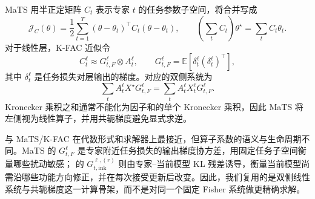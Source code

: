 MaTS 用半正定矩阵 $C_t$ 表示专家 $t$ 的任务参数子空间，将合并写成
\begin{equation}
  \mathcal J_C(\theta)
  =
  \frac12\sum_{t=1}^T
  (\theta-\theta_t)^\top C_t(\theta-\theta_t),
  \qquad
  \left(\sum_tC_t\right)\theta^\star
  =
  \sum_tC_t\theta_t.
  \label{eq:ink-mats-subspace}
\end{equation}
对于线性层，K-FAC 近似令
\begin{equation}
  C_t^\ell\approx G_{t,F}^\ell\otimes A_t^\ell,
  \qquad
  G_{t,F}^\ell
  =
  \mathbb E\left[\delta_t^\ell(\delta_t^\ell)^\top\right],
\end{equation}
其中 $\delta_t^\ell$ 是任务损失对层输出的梯度。对应的双侧系统为
\begin{equation}
  \sum_tA_t^\ell X^\star G_{t,F}^\ell
  =
  \sum_tA_t^\ell X_t^\ell G_{t,F}^\ell.
  \label{eq:ink-mats-bilateral}
\end{equation}
Kronecker 乘积之和通常不能化为因子和的单个 Kronecker 乘积，因此 MaTS 将左侧视为线性算子，并用共轭梯度避免显式求逆。

\method{} 与 MaTS/K-FAC 在代数形式和求解器上最接近，但算子系数的语义与生命周期不同。MaTS 的 $G_{t,F}^\ell$ 是专家附近任务损失的输出梯度协方差，用固定任务子空间衡量哪些扰动敏感；\method{} 的 $G_{t,\mathrm{ink}}^{\ell,(r)}$ 则由专家--当前模型 KL 残差诱导，衡量当前模型尚需沿哪些功能方向修正，并在每次接受更新后改变。因此，我们复用的是双侧线性系统与共轭梯度这一计算骨架，而不是对同一个固定 Fisher 系统做更精确求解。
